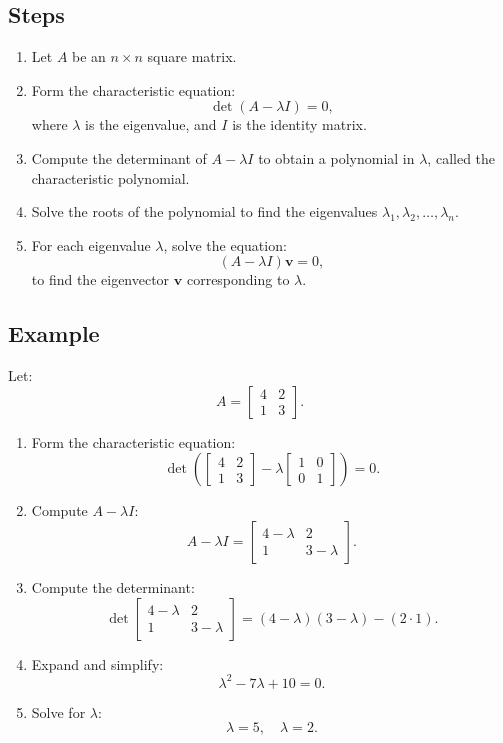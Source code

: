 \documentclass[journal]{IEEEtran}
\begin{document}
\subsection*{Steps}
\begin{enumerate}
    \item Let $A$ be an $n \times n$ square matrix.
    \item Form the characteristic equation:
    $$ \det(A - \lambda I) = 0, $$
    where $\lambda$ is the eigenvalue, and $I$ is the identity matrix.
    \item Compute the determinant of $A - \lambda I$ to obtain a polynomial in $\lambda$, called the characteristic polynomial.
    \item Solve the roots of the polynomial to find the eigenvalues $\lambda_1, \lambda_2, \dots, \lambda_n$.
    \item For each eigenvalue $\lambda$, solve the equation:
    $$ (A - \lambda I)\mathbf{v} = 0, $$
    to find the eigenvector $\mathbf{v}$ corresponding to $\lambda$.
\end{enumerate}

\subsection*{Example}
Let:
$$
A = \begin{bmatrix} 4 & 2 \\ 1 & 3 \end{bmatrix}.
$$
\begin{enumerate}
    \item Form the characteristic equation:
    $$ \det\left(\begin{bmatrix} 4 & 2 \\ 1 & 3 \end{bmatrix} - \lambda \begin{bmatrix} 1 & 0 \\ 0 & 1 \end{bmatrix}\right) = 0. $$
    \item Compute $A - \lambda I$:
    $$ A - \lambda I = \begin{bmatrix} 4 - \lambda & 2 \\ 1 & 3 - \lambda \end{bmatrix}. $$
    \item Compute the determinant:
    $$ \det\begin{bmatrix} 4 - \lambda & 2 \\ 1 & 3 - \lambda \end{bmatrix} = (4 - \lambda)(3 - \lambda) - (2 \cdot 1). $$
    \item Expand and simplify:
    $$ \lambda^2 - 7\lambda + 10 = 0. $$
    \item Solve for $\lambda$:
    $$ \lambda = 5, \quad \lambda = 2. $$
\end{enumerate}
\end{document}
